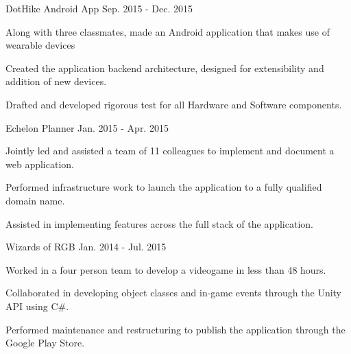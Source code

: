 \begin{cventries}
  \cventry
    {DotHike Android App} %
    {} %
    {} %
    {Sep. 2015 - Dec. 2015} %
    {
      \begin{cvitems} %
        \item {Along with three classmates, made an Android application that makes use of wearable devices}
        \item {Created the application backend architecture, designed for extensibility and addition of new devices.}
        \item {Drafted and developed rigorous test for all Hardware and Software components.}
        \\
      \end{cvitems}
    }
    
  \cventry
    {Echelon Planner} %
    {} %
    {} %
    {Jan. 2015 - Apr. 2015} %
    {
      \begin{cvitems} %
        \item {Jointly led and assisted a team of 11 colleagues to implement and document a web application.}
        \item {Performed infrastructure work to launch the application to a fully qualified domain name.}
        \item {Assisted in implementing features across the full stack of the application.}
        \\
      \end{cvitems}
    } 

  \cventry
    {Wizards of RGB} %
    {} %
    {} %
    {Jan. 2014 - Jul. 2015} %
    {
      \begin{cvitems} %
        \item {Worked in a four person team to develop a videogame in less than 48 hours.}
        \item {Collaborated in developing object classes and in-game events through the Unity API using C\#.}
        \item {Performed maintenance and restructuring to publish the application through the Google Play Store.}
        \\
      \end{cvitems}
    } 
    


\end{cventries}
